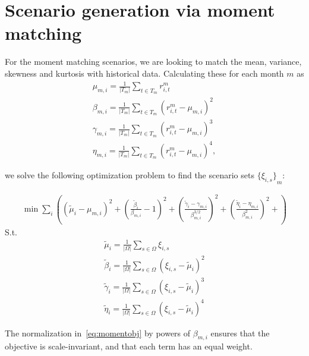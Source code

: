 \section{Scenario generation via moment matching}

For the moment matching scenarios, we are looking to match the mean, variance, skewness and kurtosis with historical data.
Calculating these for each month $m$ as
\begin{gather}
\mu_{m,i} = \frac{1}{|T_m|} \sum_{t \in T_m} r^m_{i,t} \\
\beta_{m,i} = \frac{1}{|T_m|} \sum_{t \in T_m} {\left( r^m_{i,t} - \mu_{m,i} \right)}^2 \\
\gamma_{m,i} = \frac{1}{|T_m|} \sum_{t \in T_m} {\left( r^m_{i,t} - \mu_{m,i} \right)}^3 \\
\eta_{m,i} = \frac{1}{|T_m|} \sum_{t \in T_m} {\left( r^m_{i,t} - \mu_{m,i} \right)}^4 ,
\end{gather}

we solve the following optimization problem to find the scenario sets ${\{\xi_{i,s}\}}_{m}$:

\begin{align}
\min \sum_i \left(
	{(\tilde{\mu}_i - \mu_{m,i})}^2 +
	{\left(\frac{\tilde{\beta}_i}{\beta_{m,i}} - 1\right)}^2 +
	{\left(\frac{\tilde{\gamma}_i - \gamma_{m,i}}{\beta_{m,i}^{3/2}}\right)}^2 +
	{\left(\frac{\tilde{\eta}_i - \eta_{m,i}}{\beta_{m,i}^{2}}\right)}^2 +
\right)
\label{eq:momentobj}
\end{align}
S.t.
\begin{align}
\tilde{\mu}_i = \frac{1}{|\Omega|} \sum_{s \in \Omega} \xi_{i,s} \\

\tilde{\beta}_i = \frac{1}{|\Omega|} \sum_{s \in \Omega} {\left( \xi_{i,s} - \tilde{\mu}_i \right)}^2 \\

\tilde{\gamma}_i = \frac{1}{|\Omega|} \sum_{s \in \Omega} {\left( \xi_{i,s} - \tilde{\mu}_i \right)}^3 \\

\tilde{\eta}_i = \frac{1}{|\Omega|} \sum_{s \in \Omega} {\left( \xi_{i,s} - \tilde{\mu}_i \right)}^4
\end{align}

The normalization in~\eqref{eq:momentobj} by powers of $\beta_{m,i}$ ensures that the objective is scale-invariant, and that each term has an equal weight.
